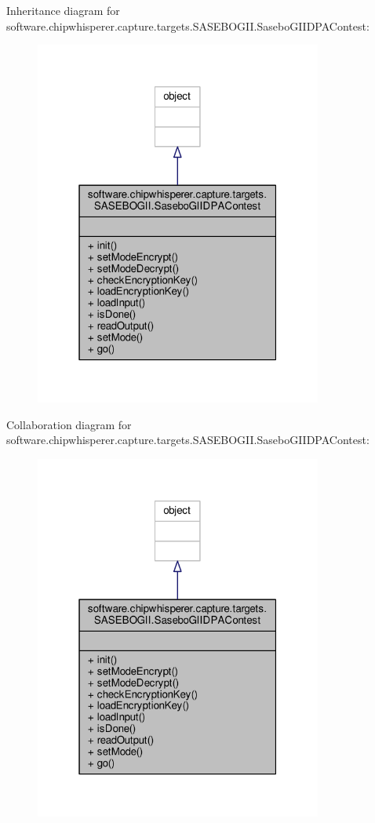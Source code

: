 Inheritance diagram for software.\+chipwhisperer.\+capture.\+targets.\+S\+A\+S\+E\+B\+O\+G\+I\+I.\+Sasebo\+G\+I\+I\+D\+P\+A\+Contest\+:\nopagebreak
\begin{figure}[H]
\begin{center}
\leavevmode
\includegraphics[width=268pt]{d6/df4/classsoftware_1_1chipwhisperer_1_1capture_1_1targets_1_1SASEBOGII_1_1SaseboGIIDPAContest__inherit__graph}
\end{center}
\end{figure}


Collaboration diagram for software.\+chipwhisperer.\+capture.\+targets.\+S\+A\+S\+E\+B\+O\+G\+I\+I.\+Sasebo\+G\+I\+I\+D\+P\+A\+Contest\+:\nopagebreak
\begin{figure}[H]
\begin{center}
\leavevmode
\includegraphics[width=268pt]{d8/d9f/classsoftware_1_1chipwhisperer_1_1capture_1_1targets_1_1SASEBOGII_1_1SaseboGIIDPAContest__coll__graph}
\end{center}
\end{figure}


